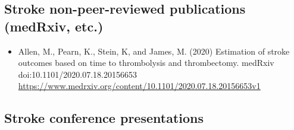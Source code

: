 \subsection{Stroke non-peer-reviewed publications (medRxiv, etc.)}

\begin{itemize}
    \item Allen, M., Pearn, K., Stein, K, and James, M. (2020) Estimation of stroke outcomes based on time to thrombolysis and thrombectomy. medRxiv doi:10.1101/2020.07.18.20156653 \url{https://www.medrxiv.org/content/10.1101/2020.07.18.20156653v1}
\end{itemize}

\subsection{Stroke conference presentations}

